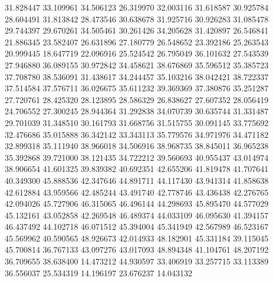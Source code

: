 31.828447
33.109961
34.506123
26.319970
32.003116
31.618587
30.925784
28.604491
31.813842
28.473546
30.638678
31.925716
30.926283
31.085478
29.744397
29.670261
34.505461
30.261426
34.205628
31.420897
26.546841
21.886345
23.582407
26.631896
27.180779
26.548652
23.392186
25.263543
20.999445
18.647719
22.096916
25.524542
26.795049
36.101632
27.543539
27.946880
36.089155
30.972842
34.458621
38.676869
35.596512
35.385723
37.708780
38.536091
31.438617
34.244457
35.103216
38.042421
38.722337
37.514584
37.576711
36.026675
35.611232
39.369369
37.380876
35.251287
27.720761
28.425320
28.123895
28.586329
26.838627
27.607352
28.056419
24.706552
27.300245
28.944364
31.292838
34.070739
30.635744
31.331487
29.701039
31.348510
30.161793
31.668756
31.515755
30.091145
33.775692
32.476686
35.015888
36.342142
33.343113
35.779576
34.971976
34.471182
32.899318
35.111940
38.966018
34.506916
38.968735
38.845011
36.965238
35.392868
39.721000
38.121435
34.722212
39.560693
40.955437
43.014974
38.906654
41.601325
39.839382
40.692351
42.655206
41.819478
41.707641
40.349300
45.888536
42.347646
44.891711
44.117430
43.941314
41.858638
42.612884
43.959566
42.485244
43.491740
42.778746
43.436438
42.276765
42.094026
45.727906
46.315065
46.496144
44.298693
45.895470
44.577029
45.132161
43.052858
42.269548
46.489374
44.033109
46.095630
41.394157
46.437492
44.102718
46.071512
45.394004
45.341949
42.567989
46.523167
45.569962
40.590565
48.926673
42.014933
48.182901
45.331184
39.115045
45.700814
36.767133
43.097276
43.017093
48.894348
41.104761
48.207192
36.709655
38.638400
14.473212
44.930597
33.406919
33.257715
33.113389
36.556037
25.534319
14.196197
23.676237
14.043132
